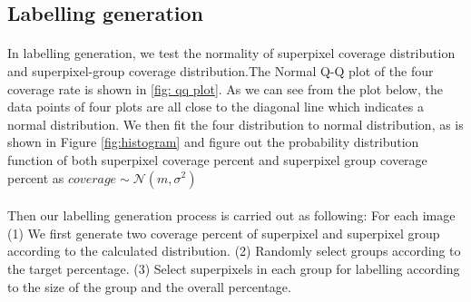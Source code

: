 \documentclass[runningheads,a4paper]{llncs}
\begin{document}
\subsection{Labelling generation}
\paragraph{} In labelling generation, we test the normality of superpixel coverage distribution and superpixel-group coverage distribution.The Normal Q-Q plot of the four coverage rate is shown in \ref{fig: qq plot}. As we can see from the plot below, the data points of four plots are all close to the diagonal line which indicates a normal distribution. We then fit the four distribution to normal distribution, as is shown in Figure \ref{fig:histogram} and figure out the probability distribution function of both superpixel coverage percent and superpixel group coverage percent as $coverage \sim \mathcal{N} (m,\sigma^2)$
\paragraph{} Then our labelling generation process is carried out as following: For each image (1) We first generate two coverage percent of superpixel and superpixel group according to the calculated  distribution. (2) Randomly select groups according to the target percentage. (3) Select superpixels in each group for labelling according to the size of the group and the overall percentage. 
\end{document}
